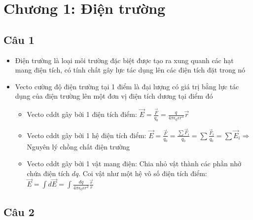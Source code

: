 \section[Chương 1]{Chương 1: Điện trường}

\subsection{Câu 1}

\begin{itemize}
  \item Điện trường là loại môi trường đặc biệt được tạo ra xung quanh các hạt mang điện tích, có tính chất gây lực tác dụng lên các điện tích đặt trong nó
  \item Vecto cường độ điện trường tại 1 điểm là đại lượng có giá trị bằng lực tác dụng của điện trường lên một đơn vị điện tích dương tại điểm đó
  \begin{itemize}
    \item Vecto cddt gây bởi 1 điện tích điểm: $\vec{E} = \frac{\vec{F}}{q_0} = \frac{q}{4\pi\epsilon_0\epsilon r^3} \vec{r}$
    \item Vecto cddt gây bởi 1 hệ điện tích điểm: $\vec{E} = \frac{\vec{F}}{q_0} = \frac{\sum\limits \vec{F}_i}{q_0} = \sum\limits \frac{\vec{F}_i}{q_0} = \sum\limits \vec{E}_i \Rightarrow$  Nguyên lý chồng chất điện trường
    \item Vecto cddt gây bởi 1 vật mang điện: Chia nhỏ vật thành các phần nhở chứa điện tích $dq$. Coi vật như một hệ vô số điện tích điểm: $\vec{E} = \int d\vec{E} = \int \frac{dq}{4\pi\epsilon_0\epsilon r^2} \frac{\vec{r}}{r}$
  \end{itemize}
\end{itemize}

\subsection{Câu 2}

